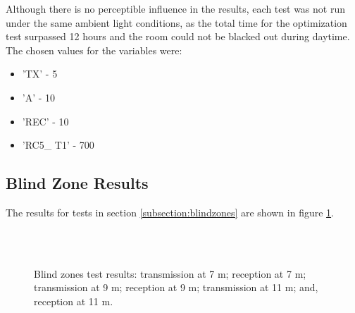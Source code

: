Although there is no perceptible influence in the results, each test was not run under the same ambient light conditions, as the total time for the optimization test surpassed 12 hours and the room could not be blacked out during daytime.\\

The chosen values for the variables were:
\begin{itemize}
\item 'TX' - 5
\item 'A' - 10
\item 'REC' - 10
\item 'RC5\_ T1' - 700
\end{itemize}

\subsection{Blind Zone Results}
\label{subsection:blindzoneresults}
The results for tests in section \ref{subsection:blindzones} are shown in figure \ref{fig:blind}.\\

\begin{figure}[!ht]
  \centering
  \hspace{8pt}
  \\
  \hspace{8pt}
  \\
  \hspace{8pt}
  \caption[Blind Zones Test Results]{Blind zones test results:
			 transmission at 7 m;
			 reception at 7 m;
			 transmission at 9 m;
			 reception at 9 m;
			 transmission at 11 m; and,
			 reception at 11 m.}%
  \label{fig:blind}%
\end{figure}


